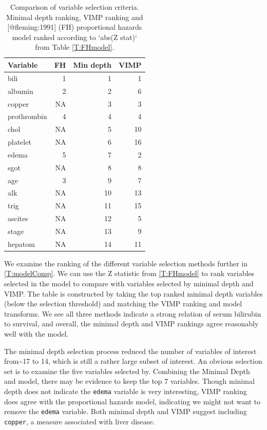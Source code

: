 \documentclass[article, nojss]{jss}
\begin{document}
\begin{Schunk}
\begin{table}

\caption{\label{tab:models}Comparison of variable selection criteria. Minimal depth ranking, VIMP ranking and [@fleming:1991] (FH) proportional hazards model ranked according to `abs(Z stat)` from Table \ref{T:FHmodel}.\label{T:modelComp}}
\centering
\begin{tabular}[t]{l|r|r|r}
\hline
Variable & FH & Min depth & VIMP\\
\hline
bili & 1 & 1 & 1\\
\hline
albumin & 2 & 2 & 6\\
\hline
copper & NA & 3 & 3\\
\hline
prothrombin & 4 & 4 & 4\\
\hline
chol & NA & 5 & 10\\
\hline
platelet & NA & 6 & 16\\
\hline
edema & 5 & 7 & 2\\
\hline
sgot & NA & 8 & 8\\
\hline
age & 3 & 9 & 7\\
\hline
alk & NA & 10 & 13\\
\hline
trig & NA & 11 & 15\\
\hline
ascites & NA & 12 & 5\\
\hline
stage & NA & 13 & 9\\
\hline
hepatom & NA & 14 & 11\\
\hline
\end{tabular}
\end{table}

\end{Schunk}

We examine the ranking of the different variable selection methods
further in \autoref{T:modelComp}. We can use the Z statistic from
\autoref{T:FHmodel} to rank variables selected in
the\citep{fleming:1991} model to compare with variables selected by
minimal depth and VIMP. The table is constructed by taking the top
ranked minimal depth variables (below the selection threshold) and
matching the VIMP ranking and\citep{fleming:1991} model transforms. We
see all three methods indicate a strong relation of serum bilirubin to
survival, and overall, the minimal depth and VIMP rankings agree
reasonably well with the\citep{fleming:1991} model.

The minimal depth selection process reduced the number of variables of
interest from\textasciitilde{}17 to 14, which is still a rather large
subset of interest. An obvious selection set is to examine the five
variables selected by\citep{fleming:1991}. Combining the Minimal Depth
and\citep{fleming:1991} model, there may be evidence to keep the top 7
variables. Though minimal depth does not indicate the \texttt{edema}
variable is very interesting, VIMP ranking does agree with the
proportional hazards model, indicating we might not want to remove the
\texttt{edema} variable. Both minimal depth and VIMP suggest including
\texttt{copper}, a measure associated with liver disease.
\end{document}
